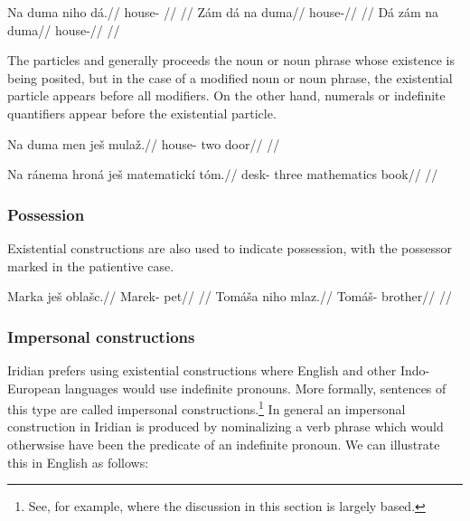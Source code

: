 \pex
\a\begingl
\gla Na duma niho dá.//
\glb \Loc{} house-\Acc{} \N{}\Exst{} \First{}\Sg{}//
\glft {}//
\endgl
\a\begingl
\gla Zám dá na duma//
\glb \Neg{} \First{}\Sg{} \Loc{} house-\Acc{}//
\glft {}//
\endgl
\a\begingl
\gla Dá zám na duma//
\glb \First{}\Sg{} \Neg{} \Loc{} house-\Acc{}//
\glft {}//
\endgl
\xe

The particles  and  generally proceeds the noun or noun
phrase whose existence is being posited, but in the case of a modified noun or
noun phrase, the existential particle appears before all modifiers. On the other
hand, numerals or indefinite quantifiers appear before the existential particle.

\pex
\begingl
\gla Na duma men ješ mulaž.//
\glb \Loc{} house-\Acc{} two \Exst{} door//
\glft {}//
\endgl
\xe

\pex
\begingl
\gla Na ránema hroná ješ matematickí tóm.//
\glb \Loc{} desk-\Acc{} three \Exst{} mathematics book//
\glft {}//
\endgl
\xe




\subsubsection{Possession}
Existential constructions are also used to indicate possession, with the
possessor marked in the patientive case.

\begin{multicols}{2}
\pex
  \begingl
    \gla Marka ješ oblašc.//
    \glb Marek-\Acc{} \Exst{} pet//
    \glft {}//
  \endgl
\xe
\pex
  \begingl
    \gla Tomáša niho mlaz.//
    \glb Tomáš-\Acc{} \N{}\Exst{} brother//
    \glft {}//
  \endgl
\xe
\end{multicols}

\subsubsection{Impersonal constructions}

Iridian prefers using existential constructions where English and
other Indo-European languages would use indefinite pronouns. More formally,
sentences of this type are called impersonal constructions.\footnote{See, for
example, \textcite{lawtagalog} where the discussion in this section is largely
based.} In general an impersonal construction in Iridian is produced by
nominalizing a verb phrase which would otherwsise have
been the predicate of an indefinite pronoun. We can illustrate this in English
as follows:

